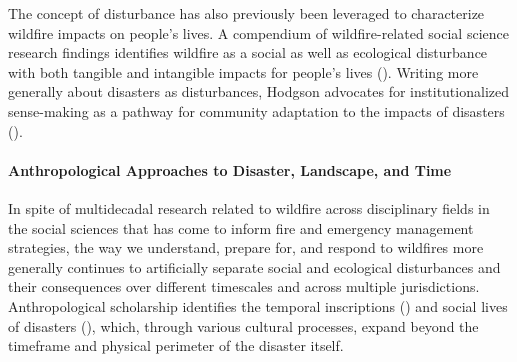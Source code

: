\documentclass[
]{article}
\begin{document}
The concept of disturbance has also previously been leveraged to characterize wildfire impacts on people's lives. A compendium of wildfire-related social science research findings identifies wildfire as a social as well as ecological disturbance with both tangible and intangible impacts for people's lives (). Writing more generally about disasters as disturbances, Hodgson advocates for institutionalized sense-making as a pathway for community adaptation to the impacts of disasters ().

\paragraph{Anthropological Approaches to Disaster, Landscape, and Time}\label{anthropological-approaches-to-disaster-landscape-and-time}

In spite of multidecadal research related to wildfire across disciplinary fields in the social sciences that has come to inform fire and emergency management strategies, the way we understand, prepare for, and respond to wildfires more generally continues to artificially separate social and ecological disturbances and their consequences over different timescales and across multiple jurisdictions. Anthropological scholarship identifies the temporal inscriptions () and social lives of disasters (), which, through various cultural processes, expand beyond the timeframe and physical perimeter of the disaster itself.
\end{document}

